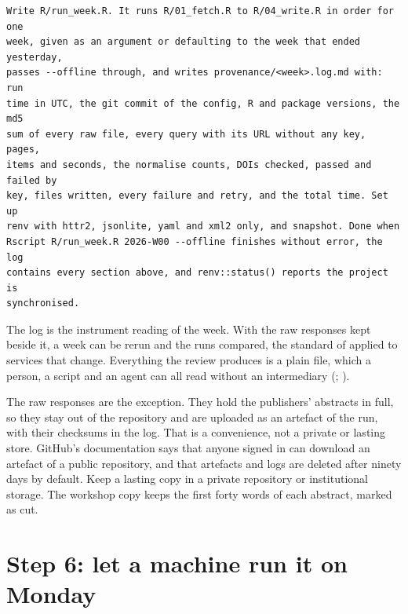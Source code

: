 \begin{lstlisting}[caption={The fifth prompt}]
Write R/run_week.R. It runs R/01_fetch.R to R/04_write.R in order for one
week, given as an argument or defaulting to the week that ended yesterday,
passes --offline through, and writes provenance/<week>.log.md with: run
time in UTC, the git commit of the config, R and package versions, the md5
sum of every raw file, every query with its URL without any key, pages,
items and seconds, the normalise counts, DOIs checked, passed and failed by
key, files written, every failure and retry, and the total time. Set up
renv with httr2, jsonlite, yaml and xml2 only, and snapshot. Done when
Rscript R/run_week.R 2026-W00 --offline finishes without error, the log
contains every section above, and renv::status() reports the project is
synchronised.
\end{lstlisting}

The log is the instrument reading of the week. With the raw responses kept
beside it, a week can be rerun and the runs compared, the standard of
 applied to services that change. Everything the
review produces is a plain file, which a person, a script and an agent can
all read without an intermediary (;
\textcite{piskala2026files}).

The raw responses are the exception. They hold the publishers' abstracts in
full, so they stay out of the repository and are uploaded as an artefact of the run, with their
checksums in the log. That is a convenience, not a private or lasting store.
GitHub's documentation says that anyone signed in can download an artefact of
a public repository, and that artefacts and logs are deleted after ninety
days by default. Keep a lasting copy in a private repository or institutional
storage. The workshop copy keeps the first forty words of each abstract,
marked as cut.

\section{Step 6: let a machine run it on Monday}

